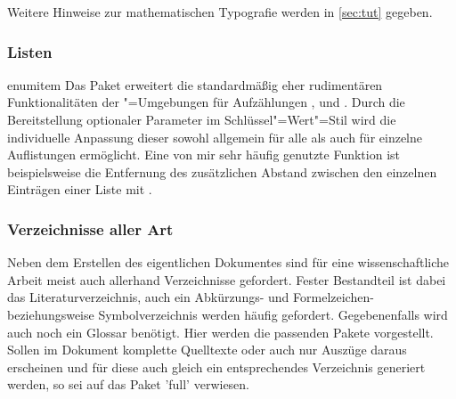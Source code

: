 %
Weitere Hinweise zur mathematischen Typografie werden in \autoref{sec:tut} 
gegeben.%
%



\subsubsection{%
  Listen%
}
%
\begin{packages}
\item[enumitem]
  Das Paket  erweitert die standardmäßig eher rudimentären 
  Funktionalitäten der "=Umgebungen für Aufzählungen 
  ,  und .
  Durch die Bereitstellung optionaler Parameter im Schlüssel"=Wert"=Stil wird 
  die individuelle Anpassung dieser sowohl allgemein für alle als auch für 
  einzelne Auflistungen ermöglicht. Eine von mir sehr häufig genutzte Funktion 
  ist beispielsweise die Entfernung des zusätzlichen Abstand zwischen den 
  einzelnen Einträgen einer Liste mit .
\end{packages}
%



\subsubsection{%
  Verzeichnisse aller Art%
}
%
Neben dem Erstellen des eigentlichen Dokumentes sind für eine wissenschaftliche 
Arbeit meist auch allerhand Verzeichnisse gefordert. Fester Bestandteil ist 
dabei das Literaturverzeichnis, auch ein Abkürzungs- und Formelzeichen- 
beziehungsweise Symbolverzeichnis werden häufig gefordert. Gegebenenfalls wird 
auch noch ein Glossar benötigt. Hier werden die passenden Pakete vorgestellt. 
Sollen im Dokument komplette Quelltexte oder auch nur Auszüge daraus erscheinen 
und für diese auch gleich ein entsprechendes Verzeichnis generiert werden, so 
sei auf das Paket 'full' verwiesen.

